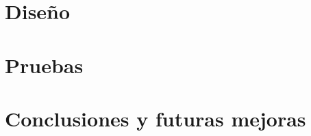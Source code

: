 \documentclass[a4paper,12pt,twoside,final]{scrbook}
\begin{document}
\part{Diseño}








\part{Pruebas}
\part{Conclusiones y futuras mejoras}


\cleardoublepage


\renewcommand{\refname}{Bibliografía}

\clearpage
\end{document}

